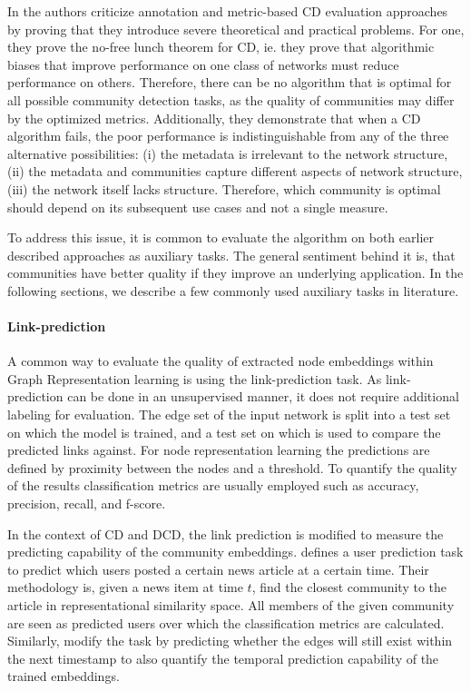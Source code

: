 \documentclass[
acmsmall,
nonacm,
screen,
acmthm]{../../scripts/pandoc/templates/acmart}
\begin{document}
In \citep{peelGroundTruthMetadata2017} the authors criticize annotation
and metric-based CD evaluation approaches by proving that they introduce
severe theoretical and practical problems. For one, they prove the
no-free lunch theorem for CD, ie. they prove that algorithmic biases
that improve performance on one class of networks must reduce
performance on others. Therefore, there can be no algorithm that is
optimal for all possible community detection tasks, as the quality of
communities may differ by the optimized metrics. Additionally, they
demonstrate that when a CD algorithm fails, the poor performance is
indistinguishable from any of the three alternative possibilities: (i)
the metadata is irrelevant to the network structure, (ii) the metadata
and communities capture different aspects of network structure, (iii)
the network itself lacks structure. Therefore, which community is
optimal should depend on its subsequent use cases and not a single
measure.

To address this issue, it is common to evaluate the algorithm on both
earlier described approaches as auxiliary tasks. The general sentiment
behind it is, that communities have better quality if they improve an
underlying application. In the following sections, we describe a few
commonly used auxiliary tasks in literature.

\hypertarget{link-prediction}{%
\paragraph{Link-prediction}\label{link-prediction}}

A common way to evaluate the quality of extracted node embeddings within
Graph Representation learning is using the link-prediction task. As
link-prediction can be done in an unsupervised manner, it does not
require additional labeling for evaluation. The edge set of the input
network is split into a test set on which the model is trained, and a
test set on which is used to compare the predicted links against. For
node representation learning the predictions are defined by proximity
between the nodes and a threshold. To quantify the quality of the
results classification metrics are usually employed such as accuracy,
precision, recall, and f-score.

In the context of CD and DCD, the link prediction is modified to measure
the predicting capability of the community embeddings.
\citet{faniUserCommunityDetection2020} defines a user prediction task to
predict which users posted a certain news article at a certain time.
Their methodology is, given a news item at time \(t\), find the closest
community to the article in representational similarity space. All
members of the given community are seen as predicted users over which
the classification metrics are calculated. Similarly,
\citet{maCommunityawareDynamicNetwork2020} modify the task by predicting
whether the edges will still exist within the next timestamp to also
quantify the temporal prediction capability of the trained embeddings.
\end{document}
